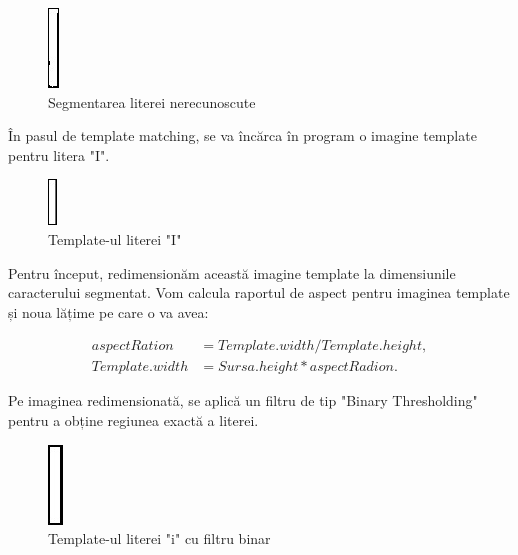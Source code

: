 \documentclass[a4paper,12pt]{report}
\begin{document}
\begin{figure}[h!]
    \centering
    \includegraphics[height=0.2\textwidth]{images/i.jpg}
    \caption{Segmentarea literei nerecunoscute}
\end{figure}
\FloatBarrier

În pasul de template matching, se va încărca în program o imagine template pentru litera "I".

\begin{figure}[h!]
    \centering
    \includegraphics[height=0.2\textwidth]{images/template.jpg}
    \caption{Template-ul literei "I"}
\end{figure}
\FloatBarrier

Pentru început, redimensionăm această imagine template la dimensiunile caracterului segmentat. Vom calcula raportul de aspect pentru imaginea template și noua lățime pe care o va avea:

\[
    \begin{aligned}
        aspectRation   & = Template.width / Template.height, \\
        Template.width & = Sursa.height * aspectRadion.
    \end{aligned}
\]

Pe imaginea redimensionată, se aplică un filtru de tip "Binary Thresholding" pentru a obține regiunea exactă a literei.

\begin{figure}[h!]
    \centering
    \includegraphics[height=0.2\textwidth]{images/binary_template.jpg}
    \caption{Template-ul literei "i" cu filtru binar}
\end{figure}
\FloatBarrier
\end{document}
